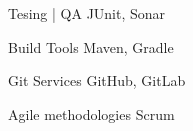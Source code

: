 \begin{cvskills}
  \cvskill
    {Tesing | QA} %
    {JUnit, Sonar} %

  \cvskill
    {Build Tools} %
    {Maven, Gradle} %

  \cvskill
    {Git Services} %
    {GitHub, GitLab} %

  \cvskill
    {Agile methodologies} %
    {Scrum} %

\end{cvskills}